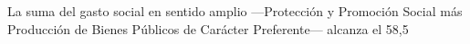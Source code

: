\documentclass[10pt,a4paper]{article}
\begin{document}
La suma del gasto social en sentido amplio —Protección y Promoción Social más Producción de Bienes Públicos de Carácter Preferente— alcanza el 58,5%
\end{document}
